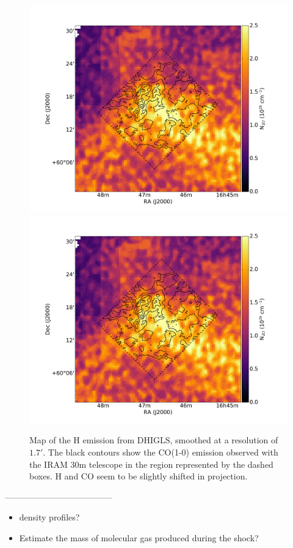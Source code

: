 \documentclass[traditabstract]{aa}
\begin{document}
\begin{figure}[h!]
  \includegraphics[page=5,width=0.48\linewidth,trim=65 30 125 75,clip=true]{Figures/HI-CO.pdf}
  \hspace{3mm}
  \includegraphics[page=6,width=0.48\linewidth,trim=65 30 125 75,clip=true]{Figures/HI-CO.pdf}
  \caption{\label{DRAO-CO} Map of the H emission from DHIGLS, smoothed at a resolution of $1.7'$. The black contours show the CO(1-0) emission observed with the IRAM 30m telescope in the region represented by the dashed boxes. H and CO seem to be slightly shifted in projection.}
\end{figure}

--------------------------------------

\begin{itemize}
  \item density profiles?
  \item Estimate the mass of molecular gas produced during the shock?
\end{itemize}
\end{document}
